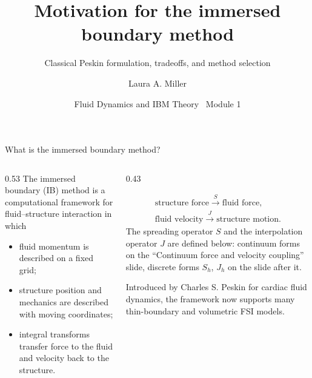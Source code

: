 \documentclass[aspectratio=169,11pt]{beamer}
\title[Immersed boundary method]{Motivation for the immersed boundary method}
\subtitle{Classical Peskin formulation, tradeoffs, and method selection}
\author[Miller]{Laura A. Miller}
\institute[UArizona]{Department of Mathematics, University of Arizona}
\date{Fluid Dynamics and IBM Theory \textbullet\ Module 1}
\let\tutorialgraphic\includegraphics
\newcommand{\creditedtitlegraphic}[2][]{%
  \tutorialgraphic[#1]{#2}\par\vspace{2pt}
  {\scriptsize Schematic after the Wikimedia Commons figure \emph{ImmersedBoundary grid} (Immersed boundary method article).\par}}
\begin{document}
\begin{frame}[plain]
\let\includegraphics\creditedtitlegraphic
{}
\end{frame}

\begin{frame}{What is the immersed boundary method?}
\begin{columns}[T,onlytextwidth]
\begin{column}{0.53\textwidth}
The immersed boundary (IB) method is a computational framework for fluid--structure interaction in which
\begin{itemize}\itemsep6pt
  \item fluid momentum is described on a fixed  grid;
  \item structure position and mechanics are described with moving  coordinates;
  \item integral transforms transfer force to the fluid and velocity back to the structure.
\end{itemize}
\end{column}
\begin{column}{0.43\textwidth}
\begin{punchbox}
\centering
\small
\[
\begin{gathered}
\text{structure force}\xrightarrow{\;S\;}\text{fluid force},\\[3pt]
\text{fluid velocity}\xrightarrow{\;J\;}\text{structure motion}.
\end{gathered}
\]
{\scriptsize The spreading operator $S$ and the interpolation operator $J$ are defined below: continuum forms on the ``Continuum force and velocity coupling'' slide, discrete forms $S_h$, $J_h$ on the slide after it.}
\end{punchbox}
\medskip
\small Introduced by Charles S. Peskin for cardiac fluid dynamics, the framework now supports many thin-boundary and volumetric FSI models.
\end{column}
\end{columns}
\end{frame}
\end{document}
